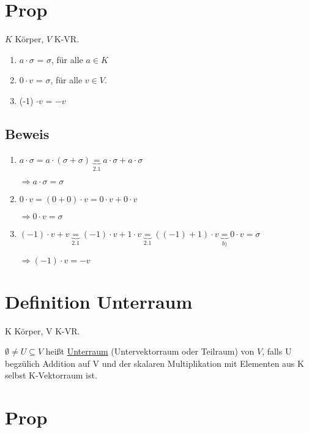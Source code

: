 \documentclass[a4paper, openany]{book}
\begin{document}
    \section{Prop}
    $K$ Körper, $V$ K-VR.

    \begin{enumerate}[label=(\alph*)]
      \item $a \cdot \sigma$ = $\sigma$, für alle $a \in K$
      \item $0 \cdot v$ = $\sigma$, für alle $v \in V$.
      \item (-1) $\cdot v$ = $-v$ 
    \end{enumerate}

    \subsection{Beweis}

    \begin{enumerate}[label=(\alph*)]
      \item $a \cdot \sigma = a \cdot (\sigma + \sigma) \underbrace{=}_{2.1} a \cdot \sigma + a \cdot \sigma$

      $\Rightarrow a \cdot \sigma = \sigma$

      \item $0 \cdot v = (0+0) \cdot v = 0 \cdot v + 0 \cdot v$

      $\Rightarrow 0 \cdot v = \sigma$

      \item $(-1) \cdot v + v \underbrace{=}_{2.1} (-1) \cdot v + 1 \cdot v \underbrace{=}_{2.1} ((-1)+1) \cdot v \underbrace{=}_{b)} 0 \cdot v = \sigma$

      $\Rightarrow (-1) \cdot v = -v$
    \end{enumerate}

    \section{Definition Unterraum}

    K Körper, V K-VR.

    $\emptyset \neq U \subseteq V$ heißt \underline{Unterraum} (Untervektorraum oder Teilraum) von $V$, falls U begzülich Addition auf V und der skalaren Multiplikation mit Elementen aus K selbst K-Vektorraum ist.

    \section{Prop}
\end{document}
